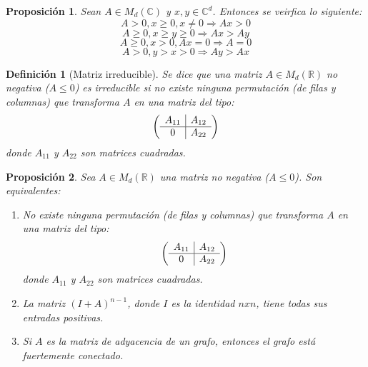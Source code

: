 \documentclass[size=a4, parskip=half, titlepage=false, toc=flat, toc=bib, 12pt]{scrartcl}
\theoremstyle{theorem-style}
\newtheorem{nprop}{Proposición}[section]
\theoremstyle{definition-style}
\newtheorem{ndef}{Definición}[section]
\theoremstyle{remark-style}
\theoremstyle{example-style}
\theoremstyle{definition-style}
\theoremstyle{remark-style}
\begin{document}
\begin{nprop}
Sean $A \in M_d(\mathbb{C})$ y $x,y \in \mathbb{C}^d$. Entonces se veirfica lo siguiente:
\begin{equation}\label{eq1} A > 0, x \geq 0, x \neq 0 \Rightarrow Ax > 0 \end{equation}
\begin{equation} A \geq 0, x \geq y \geq 0 \Rightarrow Ax > Ay \end{equation}
\begin{equation} A \geq 0, x > 0, Ax = 0 \Rightarrow A = 0 \end{equation}
\begin{equation} A > 0, y > x > 0 \Rightarrow Ay > Ax \end{equation}
\end{nprop}

\begin{ndef}[Matriz irreducible]
Se dice que una matriz $A \in M_d(\mathbb{R})$ no negativa ($A \leq 0$) es irreducible si no existe ninguna permutación (de filas y columnas) que transforma $A$ en una matriz del tipo:
$$\left(
      \begin{array}{{c|c}}
            A_{11}    &    A_{12}  \\\hline
            0         &    A_{22}     \\
      \end{array}   \right)$$
donde $A_{11}$ y $A_{22}$ son matrices cuadradas.
\end{ndef}
\begin{nprop}
\label{irreducible}
Sea $A \in M_d(\mathbb{R})$ una matriz no negativa ($A \leq 0$). Son equivalentes:
\begin{enumerate}
\item No existe ninguna permutación (de filas y columnas) que transforma $A$ en una matriz del tipo:
$$\left(
      \begin{array}{{c|c}}
            A_{11}    &    A_{12}  \\\hline
            0         &    A_{22}     \\
      \end{array}   \right)$$
donde $A_{11}$ y $A_{22}$ son matrices cuadradas.
\item La matriz $(I + A)^{n - 1}$, donde $I$ es la identidad $n x n$, tiene todas sus entradas positivas.
\item Si $A$ es la matriz de adyacencia de un grafo, entonces el grafo está fuertemente conectado.
\end{enumerate}
\end{nprop}
\end{document}
